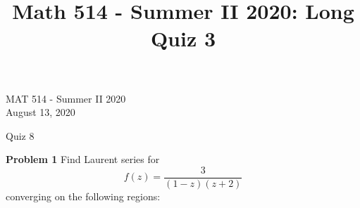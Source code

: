 \documentclass[12pt,oneside]{exam}
\title{Math 514 - Summer II 2020: Long Quiz 3}
\newenvironment{exercise}[1]{\vspace{.1in}\noindent\textbf{Problem #1 \hspace{.05em}}}{}
\begin{document}
\begin{flushright}
\sc MAT 514 - Summer II 2020\\
August 13, 2020
\end{flushright}
\bigskip
 
\begin{center}
\textsf{Quiz 8} 
\end{center}

\begin{exercise}{1}
Find Laurent series for 
\begin{equation*}
f(z)=\frac{3}{(1-z)(z+2)}
\end{equation*}
converging on the following regions:
\vspace{0.5cm}
\end{exercise}
\end{document}
